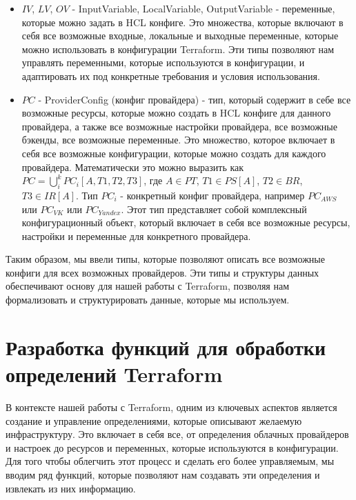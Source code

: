 \begin{itemize}
\item $IV$, $LV$, $OV$ - InputVariable, LocalVariable, OutputVariable -
переменные, которые можно задать в HCL конфиге. Это множества, которые включают
в себя все возможные входные, локальные и выходные переменные, которые можно
использовать в конфигурации Terraform. Эти типы позволяют нам управлять
переменными, которые используются в конфигурации, и адаптировать их под
конкретные требования и условия использования.

\item $PC$ - ProviderConfig (конфиг провайдера) - тип, который содержит в себе
все возможные ресурсы, которые можно создать в HCL конфиге для данного
провайдера, а также все возможные настройки провайдера, все возможные бэкенды,
все возможные переменные. Это множество, которое включает в себя все возможные
конфигурации, которые можно создать для каждого провайдера. Математически это
можно выразить как $PC = \bigcup_i^k{PC_i[A, T1, T2, T3]}$, где $A \in PT$, $T1
\in PS[A]$, $T2 \in BR$, $T3 \in IR[A]$. Тип $PC_i$ - конкретный конфиг
провайдера, например $PC_{AWS}$ или $PC_{VK}$ или $PC_{Yandex}$. Этот тип
представляет собой комплексный конфигурационный объект, который включает в себя
все возможные ресурсы, настройки и переменные для конкретного провайдера.
\end{itemize}

Таким образом, мы ввели типы, которые позволяют описать все возможные конфиги
для всех возможных провайдеров. Эти типы и структуры данных обеспечивают основу
для нашей работы с Terraform, позволяя нам формализовать и структурировать
данные, которые мы используем.

\section{Разработка функций для обработки определений Terraform}

В контексте нашей работы с Terraform, одним из ключевых аспектов является
создание и управление определениями, которые описывают желаемую инфраструктуру.
Это включает в себя все, от определения облачных провайдеров и настроек до
ресурсов и переменных, которые используются в конфигурации. Для того чтобы
облегчить этот процесс и сделать его более управляемым, мы вводим ряд функций,
которые позволяют нам создавать эти определения и извлекать из них информацию.

